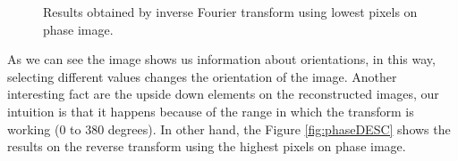 \documentclass[12pt,a4paper]{article}
\begin{document}
\begin{figure}[!h]
	\quad

	\caption{Results obtained by inverse Fourier transform using lowest pixels on phase image.}
	\label{fig:phaseINC}
\end{figure}

As we can see the image shows us information about orientations, in this way, selecting different values changes the orientation of the image. Another interesting fact are the upside down elements on the reconstructed images, our intuition is that it happens because of the range in which the transform is working (0 to 380 degrees). In other hand, the Figure \ref{fig:phaseDESC} shows the results on the reverse transform using the highest pixels on phase image. \\
\end{document}
